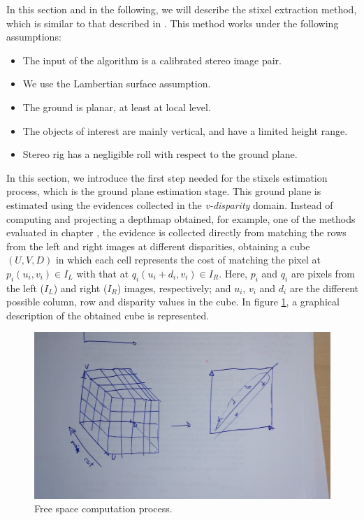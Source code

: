 In this section and in the following, we will describe the stixel extraction method, which is similar to that described in \cite{benenson2012pedestrian}. This method works under the following assumptions:

\begin{itemize}
 \item The input of the algorithm is a calibrated stereo image pair.
 \item We use the Lambertian surface assumption.
 \item The ground is planar, at least at local level.
 \item The objects of interest are mainly vertical, and have a limited height range.
 \item Stereo rig has a negligible roll with respect to the ground plane.
\end{itemize}

In this section, we introduce the first step needed for the stixels estimation process, which is the ground plane estimation stage. This ground plane is estimated using the evidences collected in the \emph{v-disparity} domain. Instead of computing and projecting a depthmap obtained, for example, one of the methods evaluated in chapter , the evidence is collected directly from matching the rows from the left and right images at different disparities, obtaining a cube $(U, V, D)$ in which each cell represents the cost of matching the pixel at $p_i(u_i, v_i) \in I_L$ with that at $q_i(u_i + d_i, v_i) \in I_R$. Here, $p_i$ and $q_i$ are pixels from the left ($I_L$) and right ($I_R$) images, respectively; and $u_i$, $v_i$ and $d_i$ are the different possible column, row and disparity values in the cube. In figure \ref{fig:cp04_freespace}, a graphical description of the obtained cube is represented.

\begin{figure}[h!]
  \centering
  \includegraphics{freespace}
  \caption{Free space computation process.}\label{fig:cp04_freespace}
\end{figure}

